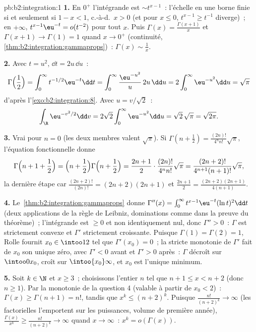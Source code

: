 \begin{solution}{pb:b2:integration:1}
\textbf{1.} En $0^+$ l'intégrande est $\sim t^{x-1}$~: l'échelle
en une borne finie  si et seulement si $1 - x < 1$, c.-à-d.\ $x > 0$
(et pour $x \leq 0$, $t^{x-1} \geq t^{-1}$ diverge)~; en
$+\infty$, $t^{x-1}\eu^{-t} = o(t^{-2})$  pour tout
$x$. Puis $\Gamma(x) = \frac{\Gamma(x+1)}{x}$ et $\Gamma(x+1)
\to \Gamma(1) = 1$ quand $x \to 0^+$ (continuité,
\cref{thm:b2:integration:gammaprops})~: $\Gamma(x) \sim
\frac1x$.

\textbf{2.} Avec $t = u^2$, $\dd t = 2u\,\dd u$~:
\[
\Gamma\Bigl(\frac12\Bigr) = \int_0^\infty
t^{-1/2}\eu^{-t}\dd t
= \int_0^\infty \frac{\eu^{-u^2}}{u}\,2u\,\dd u
= 2\int_0^\infty \eu^{-u^2}\dd u = \sqrt\pi
\]
d'après l'\cref{exo:b2:integration:8}. Avec $u = v/\sqrt2$~:
\[
\int_\R \eu^{-v^2/2}\dd v
= 2\sqrt2\int_0^\infty \eu^{-u^2}\dd u
= \sqrt2\,\sqrt\pi = \sqrt{2\pi} .
\]

\textbf{3.} Vrai pour $n = 0$ (les deux membres valent $\sqrt\pi$). Si
$\Gamma(n + \frac12) = \frac{(2n)!}{4^n n!}\sqrt\pi$, l'équation
fonctionnelle donne
\[
\Gamma\Bigl(n + 1 + \frac12\Bigr)
= \Bigl(n + \frac12\Bigr)\Gamma\Bigl(n + \frac12\Bigr)
= \frac{2n+1}{2}\cdot\frac{(2n)!}{4^n n!}\sqrt\pi
= \frac{(2n+2)!}{4^{n+1}(n+1)!}\sqrt\pi ,
\]
la dernière étape car $\frac{(2n+2)!}{(2n)!} = (2n+2)(2n+1)$
et $\frac{2n+1}{2} = \frac{(2n+2)(2n+1)}{4(n+1)}$.

\textbf{4.} Le~\cref{thm:b2:integration:gammaprops} donne
$\Gamma''(x) = \int_0^\infty t^{x-1}\eu^{-t}(\ln t)^2\dd t$
(deux applications de la règle de Leibniz, dominations comme dans la
preuve du théorème)~; l'intégrande est $\geq 0$ et non identiquement
nul, donc $\Gamma'' > 0$~: $\Gamma$ est strictement convexe et
$\Gamma'$ strictement croissante. Puisque $\Gamma(1) = \Gamma(2)
= 1$, Rolle fournit $x_0 \in \intoo12$ tel que $\Gamma'(x_0) =
0$~; la stricte monotonie de $\Gamma'$ fait de $x_0$ son unique
zéro, avec $\Gamma' < 0$ avant et $\Gamma' > 0$ après~:
$\Gamma$ décroît sur $\intoo0{x_0}$, croît sur
$\intoo{x_0}\infty$, et $x_0$ est l'unique minimum.

\textbf{5.} Soit $k \in \N$ et $x \geq 3$~; choisissons l'entier
$n$ tel que $n + 1 \leq x < n + 2$ (donc $n \geq 1$). Par la
monotonie de la question 4 (valable à partir de $x_0 < 2$)~: $\Gamma(x)
\geq \Gamma(n + 1) = n!$, tandis que $x^k \leq (n+2)^k$. Puisque
$\frac{n!}{(n+2)^k} \to \infty$ (les factorielles l'emportent sur les puissances,
volume de première année), $\frac{\Gamma(x)}{x^k} \geq \frac{n!}{(n+2)^k} \to
\infty$ quand $x \to \infty$~: $x^k = o(\Gamma(x))$.


\end{solution}

